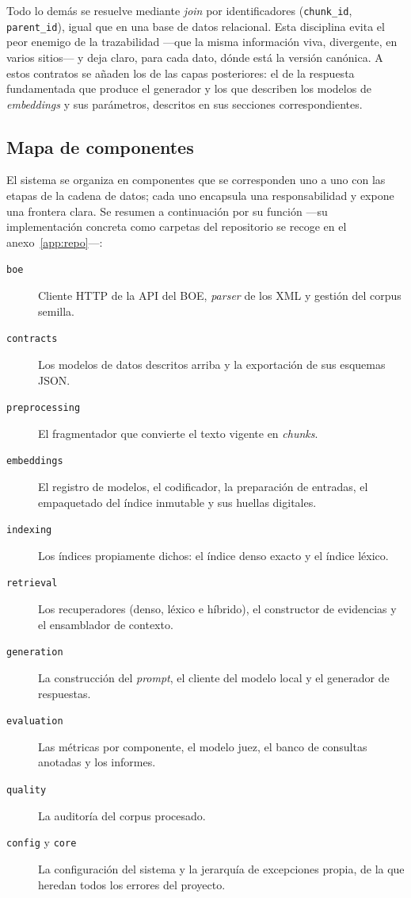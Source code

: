 Todo lo demás se resuelve mediante \emph{join} por identificadores (\texttt{chunk\_id}, \texttt{parent\_id}), igual que en una base de datos relacional. Esta disciplina evita el peor enemigo de la trazabilidad —que la misma información viva, divergente, en varios sitios— y deja claro, para cada dato, dónde está la versión canónica. A estos contratos se añaden los de las capas posteriores: el de la respuesta fundamentada que produce el generador y los que describen los modelos de \emph{embeddings} y sus parámetros, descritos en sus secciones correspondientes.

\subsection{Mapa de componentes}
\label{subsec:mapa-componentes}

El sistema se organiza en componentes que se corresponden uno a uno con las etapas de la cadena de datos; cada uno encapsula una responsabilidad y expone una frontera clara. Se resumen a continuación por su función —su implementación concreta como carpetas del repositorio se recoge en el anexo~\ref{app:repo}—:

\begin{description}
  \item[\texttt{boe}] Cliente HTTP de la API del BOE, \emph{parser} de los XML y gestión del corpus semilla.
  \item[\texttt{contracts}] Los modelos de datos descritos arriba y la exportación de sus esquemas JSON.
  \item[\texttt{preprocessing}] El fragmentador que convierte el texto vigente en \emph{chunks}.
  \item[\texttt{embeddings}] El registro de modelos, el codificador, la preparación de entradas, el empaquetado del índice inmutable y sus huellas digitales.
  \item[\texttt{indexing}] Los índices propiamente dichos: el índice denso exacto y el índice léxico.
  \item[\texttt{retrieval}] Los recuperadores (denso, léxico e híbrido), el constructor de evidencias y el ensamblador de contexto.
  \item[\texttt{generation}] La construcción del \emph{prompt}, el cliente del modelo local y el generador de respuestas.
  \item[\texttt{evaluation}] Las métricas por componente, el modelo juez, el banco de consultas anotadas y los informes.
  \item[\texttt{quality}] La auditoría del corpus procesado.
  \item[\texttt{config} y \texttt{core}] La configuración del sistema y la jerarquía de excepciones propia, de la que heredan todos los errores del proyecto.
\end{description}

